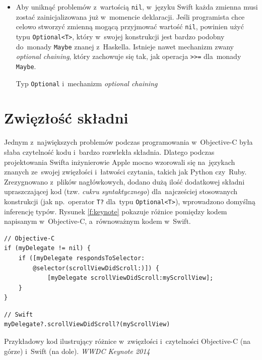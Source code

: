\documentclass[mgr, shortabstract]{iithesis}
\newcommand{\swiftlisting}[2]{
    \swiftcode{src/#1.swift}
    \begin{listing}[ht]
      \caption{#2}
      \label{l:#1}
    \end{listing}
}
\begin{document}
\begin{itemize}
    \item Aby uniknąć problemów z~wartością \texttt{nil}, w~języku Swift każda zmienna musi zostać zainicjalizowana już w~momencie deklaracji. Jeśli programista chce celowo stworzyć zmienną mogącą przyjmować wartość \texttt{nil}, powinien użyć typu \texttt{Optional<T>}, który w~swojej konstrukcji jest bardzo podobny do~monady \texttt{Maybe} znanej z~Haskella. Istnieje nawet mechanizm zwany \textit{optional chaining}, który zachowuje się tak, jak operacja \texttt{>>=} dla~monady \texttt{Maybe}.

    \swiftlisting
        {2_optional}
        {Typ \texttt{Optional} i~mechanizm \textit{optional chaining}}

\end{itemize}

\section{Zwięzłość składni}
\label{s:zwiezlosc_skladni}

Jednym z~największych problemów podczas programowania w~Objective-C była słaba czytelność kodu i~bardzo rozwlekła składnia. Dlatego podczas projektowania Swifta inżynierowie Apple mocno wzorowali się na~językach znanych ze~swojej zwięzłości i~łatwości czytania, takich jak Python czy~Ruby. Zrezygnowano z~plików nagłówkowych, dodano dużą ilość dodatkowej składni upraszczającej kod (tzw. \textit{cukru syntaktycznego}) dla~najcześciej stosowanych konstrukcji (jak np.~operator \texttt{T?} dla~typu \texttt{Optional<T>}), wprowadzono domyślną inferencję typów. Rysunek \ref{f:keynote} pokazuje różnice pomiędzy kodem napisanym w~Objective-C, a~równoważnym kodem w~Swift.

\begin{listing}[ht]
\begin{verbatim}
// Objective-C
if (myDelegate != nil) {
    if ([myDelegate respondsToSelector:
        @selector(scrollViewDidScroll:)]) {
            [myDelegate scrollViewDidScroll:myScrollView];
    }
}
\end{verbatim}

\begin{verbatim}
// Swift
myDelegate?.scrollViewDidScroll?(myScrollView)
\end{verbatim}
\caption{Przykładowy kod ilustrujący różnice w~zwięzłości i~czytelności Objective-C (na górze) i~Swift (na dole). \textit{WWDC Keynote 2014}}
\label{f:keynote}
\end{listing}
\end{document}
